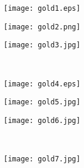 \documentclass[twoside]{article}
\begin{document}
    \vspace{0em}\begin{center}
    \begin{minipage}{0.3\textwidth}\begin{center}\texttt{[image: gold1.eps]}\vfill\end{center}\end{minipage}
        \hspace{1em}\begin{minipage}{0.3\textwidth}\begin{center}\texttt{[image: gold2.png]}\vfill\end{center}\end{minipage}
        \hspace{1em}\begin{minipage}{0.3\textwidth}\begin{center}\texttt{[image: gold3.jpg]}\vfill\end{center}\end{minipage}
        \\
            \begin{minipage}{0.3\textwidth}\begin{center}\texttt{[image: gold4.eps]}\vfill\end{center}\end{minipage}
        \hspace{1em}\begin{minipage}{0.3\textwidth}\begin{center}\texttt{[image: gold5.jpg]}\vfill\end{center}\end{minipage}
        \hspace{1em}\begin{minipage}{0.3\textwidth}\begin{center}\texttt{[image: gold6.jpg]}\vfill\end{center}\end{minipage}
        \\
            \begin{minipage}{0.3\textwidth}\begin{center}\texttt{[image: gold7.jpg]}\vfill\end{center}\end{minipage}

\end{center}
\end{document}
